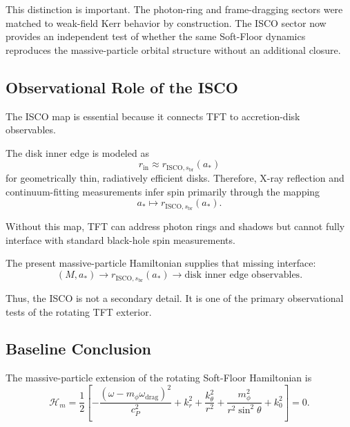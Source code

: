 This distinction is important. The photon-ring and frame-dragging sectors were matched to weak-field Kerr behavior by construction. The ISCO sector now provides an independent test of whether the same Soft-Floor dynamics reproduces the massive-particle orbital structure without an additional closure.

\subsection{Observational Role of the ISCO}

The ISCO map is essential because it connects TFT to accretion-disk observables.

The disk inner edge is modeled as
\begin{equation}
    r_{\mathrm{in}} \approx r_{\mathrm{ISCO},s_{\mathrm{br}}}(a_\ast)
\end{equation}
for geometrically thin, radiatively efficient disks. Therefore, X-ray reflection and continuum-fitting measurements infer spin primarily through the mapping
\begin{equation}
    a_\ast \longmapsto r_{\mathrm{ISCO},s_{\mathrm{br}}}(a_\ast).
\end{equation}

Without this map, TFT can address photon rings and shadows but cannot fully interface with standard black-hole spin measurements.

The present massive-particle Hamiltonian supplies that missing interface:
\begin{equation}
    \boxed{ (M,a_\ast) \longrightarrow r_{\mathrm{ISCO},s_{\mathrm{br}}}(a_\ast) \longrightarrow \text{disk inner edge observables}. }
\end{equation}

Thus, the ISCO is not a secondary detail. It is one of the primary observational tests of the rotating TFT exterior.

\subsection{Baseline Conclusion}

The massive-particle extension of the rotating Soft-Floor Hamiltonian is
\begin{equation}
    \boxed{ \mathcal{H}_m = \frac{1}{2} \left[ - \frac{ \left( \omega - m_{\phi}\omega_{\mathrm{drag}} \right)^2 }{ c_P^2 } + k_r^2 + \frac{k_{\theta}^2}{r^2} + \frac{m_{\phi}^2}{r^2\sin^2\theta} + k_0^2 \right] = 0. }
\end{equation}

